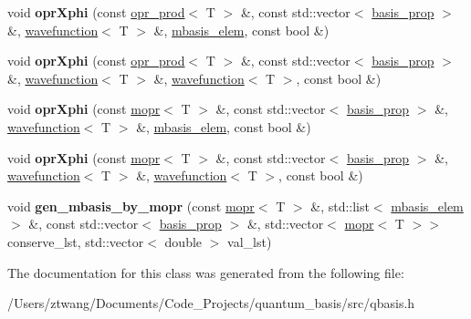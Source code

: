\begin{DoxyCompactItemize}
\item 
\mbox{\label{classqbasis_1_1wavefunction_a358a9009899e330604ef5cef110115f2}} 
void {\bfseries opr\+Xphi} (const \hyperlink{classqbasis_1_1opr__prod}{opr\+\_\+prod}$<$ T $>$ \&, const std\+::vector$<$ \hyperlink{classqbasis_1_1basis__prop}{basis\+\_\+prop} $>$ \&, \hyperlink{classqbasis_1_1wavefunction}{wavefunction}$<$ T $>$ \&, \hyperlink{classqbasis_1_1mbasis__elem}{mbasis\+\_\+elem}, const bool \&)
\item 
\mbox{\label{classqbasis_1_1wavefunction_aaec0b4b8d0787d76e9e56aac52e4f346}} 
void {\bfseries opr\+Xphi} (const \hyperlink{classqbasis_1_1opr__prod}{opr\+\_\+prod}$<$ T $>$ \&, const std\+::vector$<$ \hyperlink{classqbasis_1_1basis__prop}{basis\+\_\+prop} $>$ \&, \hyperlink{classqbasis_1_1wavefunction}{wavefunction}$<$ T $>$ \&, \hyperlink{classqbasis_1_1wavefunction}{wavefunction}$<$ T $>$, const bool \&)
\item 
\mbox{\label{classqbasis_1_1wavefunction_a3fec6e182555899e170646f231d6d759}} 
void {\bfseries opr\+Xphi} (const \hyperlink{classqbasis_1_1mopr}{mopr}$<$ T $>$ \&, const std\+::vector$<$ \hyperlink{classqbasis_1_1basis__prop}{basis\+\_\+prop} $>$ \&, \hyperlink{classqbasis_1_1wavefunction}{wavefunction}$<$ T $>$ \&, \hyperlink{classqbasis_1_1mbasis__elem}{mbasis\+\_\+elem}, const bool \&)
\item 
\mbox{\label{classqbasis_1_1wavefunction_a2579cd6e4389cbf1e32d3addc3733f85}} 
void {\bfseries opr\+Xphi} (const \hyperlink{classqbasis_1_1mopr}{mopr}$<$ T $>$ \&, const std\+::vector$<$ \hyperlink{classqbasis_1_1basis__prop}{basis\+\_\+prop} $>$ \&, \hyperlink{classqbasis_1_1wavefunction}{wavefunction}$<$ T $>$ \&, \hyperlink{classqbasis_1_1wavefunction}{wavefunction}$<$ T $>$, const bool \&)
\item 
\mbox{\label{classqbasis_1_1wavefunction_a4eb4692297545b8baf275681ed69f625}} 
void {\bfseries gen\+\_\+mbasis\+\_\+by\+\_\+mopr} (const \hyperlink{classqbasis_1_1mopr}{mopr}$<$ T $>$ \&, std\+::list$<$ \hyperlink{classqbasis_1_1mbasis__elem}{mbasis\+\_\+elem} $>$ \&, const std\+::vector$<$ \hyperlink{classqbasis_1_1basis__prop}{basis\+\_\+prop} $>$ \&, std\+::vector$<$ \hyperlink{classqbasis_1_1mopr}{mopr}$<$ T $>$$>$ conserve\+\_\+lst, std\+::vector$<$ double $>$ val\+\_\+lst)
\end{DoxyCompactItemize}


The documentation for this class was generated from the following file\+:\begin{DoxyCompactItemize}
\item 
/\+Users/ztwang/\+Documents/\+Code\+\_\+\+Projects/quantum\+\_\+basis/src/qbasis.\+h\end{DoxyCompactItemize}
